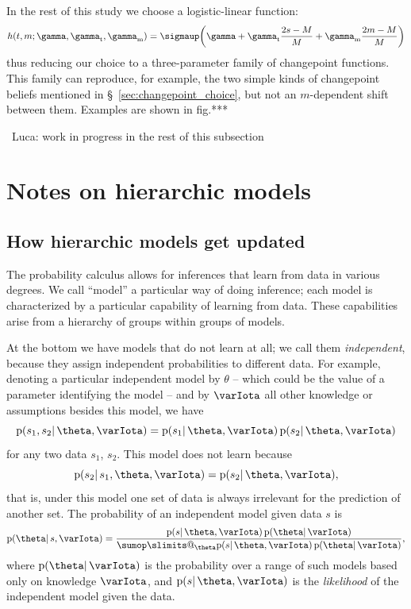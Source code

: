 \documentclass[\ifafour a4paper,12pt,\else a5paper,10pt,\fi%
onecolumn,oneside,article,%
british%
]{memoir}
\makeatletter
\theoremstyle{remark}
\theoremstyle{innote}
\def\sum{\DOTSI\sumop\slimits@}
\newcommand*{\pf}{\mathrm{p}}%
\renewcommand*{\|}{\mathpunct{|}}
\newcommand*{\sect}{\S}%
\newcommand*{\fig}{fig.}%
\newcommand*{\puzzle}{\maltese}
\newcommand{\mynote}[1]{ {\color{notecolour}\puzzle\ #1\ }}
\newcommand*{\yI}{\varIota}
\newcommand*{\yth}{\theta}
\newcommand*{\yrs}{h}
\newcommand*{\yc}{\gamma}
\newcommand*{\ycs}{\gamma_{\textrm{t}}}
\newcommand*{\ycm}{\gamma_{\textrm{m}}}
\newcommand*{\logistic}{\sigmaup}
\makeatother
\begin{document}
In the rest of this study we choose a logistic-linear function:
\begin{equation}
  \label{eq:logistic_linear}
  \yrs(t,m; \yc,\ycs,\ycm) = \logistic\biggl( \yc +
  \ycs \frac{2s-M}{M} + \ycm \frac{2m-M}{M}\biggr) 
\end{equation}
thus reducing our choice to a three-parameter family of changepoint
functions. This family can reproduce, for example, the two simple kinds of
changepoint beliefs mentioned in \sect~\ref{sec:changepoint_choice}, but
not an $m$-dependent shift between them. Examples are shown in \fig***




\bigskip\mynote{Luca: work in progress in the rest of this subsection}


\clearpage

\section{Notes on hierarchic models}
\label{sec:notes_hierarchic}

\subsection{How hierarchic models get updated}
\label{sec:hierarchic_models}

The probability calculus allows for inferences that learn from data in
various degrees. We call \enquote{model} a particular way of doing
inference; each model is characterized by a particular capability of
learning from data. These capabilities arise from a hierarchy of groups
within groups of models.

At the bottom we have models that do not learn at all; we call them
\emph{independent}, because they assign independent probabilities to
different data. For example, denoting a particular independent model by
$\yth$ -- which could be the value of a parameter identifying the model --
and by $\yI$ all other knowledge or assumptions besides this model, we have
\begin{equation}
  \label{eq:indep_model}
  \pf(s_1,s_2 \| \yth, \yI) = \pf(s_1 \|\yth,\yI) \, \pf(s_2 \|\yth,\yI)
\end{equation}
for any two data $s_1$, $s_2$. This model does not learn because
\begin{equation}
  \label{eq:indep_model_nolearn}
  \pf(s_2\| s_1, \yth, \yI) = \pf(s_2 \|\yth,\yI),
\end{equation}
that is, under this model one set of data is always irrelevant for the
prediction of another set. The probability of an independent model given
data $s$ is
\begin{equation}
  \label{eq:prob_indep_model}
  \pf(\yth \| s, \yI)
  = \frac{
    \pf(s \|\yth,\yI) \, \pf(\yth \| \yI)
  }{
    \sum_{\yth}\pf(s \|\yth,\yI) \, \pf(\yth \| \yI)
  },
\end{equation}
where $\pf(\yth \|\yI)$ is the probability over a range of such models
based only on knowledge $\yI$, and $\pf(s \|\yth,\yI)$ is the
\emph{likelihood} of the independent model given the data.
\end{document}
